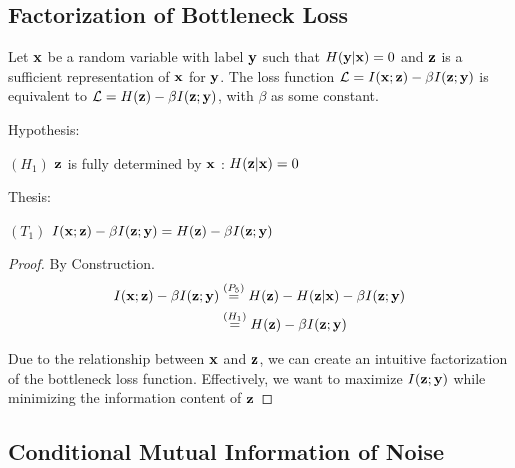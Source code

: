 \subsection{Factorization of Bottleneck Loss}

\begin{lemma}
    Let ${\mathbf{x}}$ be a random variable with label ${\mathbf{y}}$ such that $H({\mathbf{y}}| {\mathbf{x}}) = 0$ and ${\mathbf{z}}$ is a sufficient representation of ${\mathbf{x}}$ for ${\mathbf{y}}$. The loss function 
    $\mathcal{L}=I({\mathbf{x}}; {\mathbf{z}})-\beta I({\mathbf{z}}; {\mathbf{y}})$ is equivalent to $\mathcal{L}=H({\mathbf{z}})-\beta I({\mathbf{z}}; {\mathbf{y}})$, with $\beta$ as some constant. 

    Hypothesis: 
    
    $(H_1)$  ${\mathbf{z}}$ is fully determined by ${\mathbf{x}}$ : $H({\mathbf{z}}|{\mathbf{x}}) = 0$

    Thesis: 

    $(T_1)$ $ I({\mathbf{x}}; {\mathbf{z}})-\beta I({\mathbf{z}}; {\mathbf{y}}) = H({\mathbf{z}})-\beta I({\mathbf{z}}; {\mathbf{y}})$

    \begin{proof} By Construction. 
    $$
        \begin{aligned}
        I({\mathbf{x}}; {\mathbf{z}})-\beta I({\mathbf{z}}; {\mathbf{y}}) &\stackrel{\left(P_5\right)}{=} H({\mathbf{z}}) - H({\mathbf{z}}| {\mathbf{x}}) -\beta I({\mathbf{z}};{\mathbf{y}}) \\
        &\stackrel{\left(H_1\right)}{=} H({\mathbf{z}}) -\beta I({\mathbf{z}}; {\mathbf{y}})
        \end{aligned}
    $$

    Due to the relationship between ${\mathbf{x}}$ and ${\mathbf{z}}$, we can create an intuitive factorization of the bottleneck loss function. Effectively, we want to maximize $I({\mathbf{z}}; {\mathbf{y}})$ while minimizing the information content of ${\mathbf{z}}$

    \end{proof}

    \label{app:domain_lossfact}
\end{lemma}

\subsection{Conditional Mutual Information of Noise}

